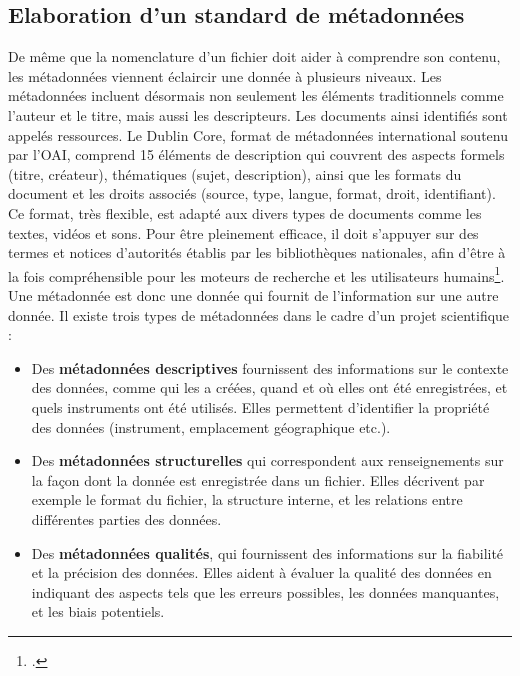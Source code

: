         \subsection{Elaboration d’un standard de métadonnées}

De même que la nomenclature d’un fichier doit aider à comprendre son contenu, les métadonnées viennent éclaircir une donnée à plusieurs niveaux. Les métadonnées incluent désormais non seulement les éléments traditionnels comme l'auteur et le titre, mais aussi les descripteurs. Les documents ainsi identifiés sont appelés ressources. Le Dublin Core, format de métadonnées international soutenu par l'OAI, comprend 15 éléments de description qui couvrent des aspects formels (titre, créateur), thématiques (sujet, description), ainsi que les formats du document et les droits associés (source, type, langue, format, droit, identifiant). Ce format, très flexible, est adapté aux divers types de documents comme les textes, vidéos et sons. Pour être pleinement efficace, il doit s'appuyer sur des termes et notices d'autorités établis par les bibliothèques nationales, afin d'être à la fois compréhensible pour les moteurs de recherche et les utilisateurs humains\footcite{ortizGuidePourValorisation}.\\

Une métadonnée est donc une donnée qui fournit de l’information sur une autre donnée. Il existe trois types de métadonnées dans le cadre d’un projet scientifique :\\

\begin{itemize}
    \item Des \textbf{métadonnées descriptives} fournissent des informations sur le contexte des données, comme qui les a créées, quand et où elles ont été enregistrées, et quels instruments ont été utilisés. Elles permettent d’identifier la propriété des données (instrument, emplacement géographique etc.).
    \item Des \textbf{métadonnées structurelles} qui correspondent aux renseignements sur la façon dont la donnée est enregistrée dans un fichier. Elles décrivent par exemple le format du fichier, la structure interne, et les relations entre différentes parties des données.
    \item Des \textbf{métadonnées qualités}, qui fournissent des informations sur la fiabilité et la précision des données. Elles aident à évaluer la qualité des données en indiquant des aspects tels que les erreurs possibles, les données manquantes, et les biais potentiels.
\end{itemize}

